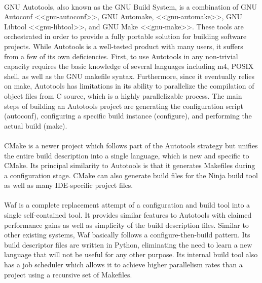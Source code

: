 \paragraph{}
GNU Autotools, also known as the GNU Build System, is a combination of GNU Autoconf <<gnu-autoconf>>, GNU Automake, <<gnu-automake>>, GNU Libtool <<gnu-libtool>>, and GNU Make <<gnu-make>>.
These tools are orchestrated in order to provide a fully portable solution for building software projects.
While Autotools is a well-tested product with many users, it suffers from a few of its own deficiencies.
First, to use Autotools in any non-trivial capacity requires the basic knowledge of several languages including m4, POSIX shell, as well as the GNU makefile syntax.
Furthermore, since it eventually relies on make, Autotools has limitations in its ability to parallelize the compilation of object files from C source, which is a highly parallelizable process.
The main steps of building an Autotools project are generating the configuration script (autoconf), configuring a specific build instance (configure), and performing the actual build (make).

\paragraph{}
CMake is a newer project which follows part of the Autotools strategy but unifies the entire build description into a single language, which is new and specific to CMake.
Its principal similarity to Autotools is that it generates Makefiles during a configuration stage.
CMake can also generate build files for the Ninja build tool as well as many IDE-specific project files.

\paragraph{}
Waf is a complete replacement attempt of a configuration and build tool into a single self-contained tool.
It provides similar features to Autotools with claimed performance gains as well as simplicity of the build description files.
Similar to other existing systems, Waf basically follows a configure-then-build pattern.
Its build descriptor files are written in Python, eliminating the need to learn a new language that will not be useful for any other purpose.
Its internal build tool also has a job scheduler which allows it to achieve higher parallelism rates than a project using a recursive set of Makefiles.

